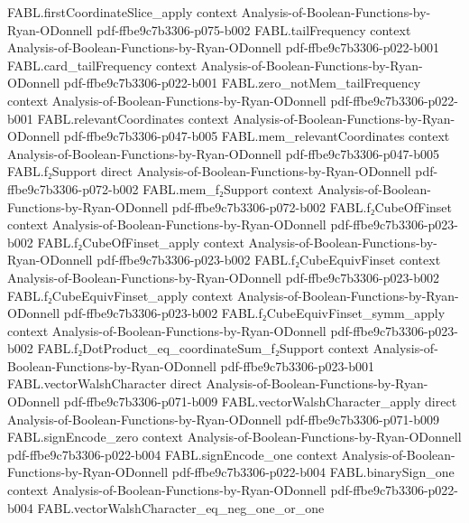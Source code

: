 \begin{theorem}
  {FABL.firstCoordinateSlice_apply}
  {context}
  {Analysis-of-Boolean-Functions-by-Ryan-ODonnell}
  {pdf-ffbe9c7b3306-p075-b002}
\proofstep
  {FABL.tailFrequency}
  {context}
  {Analysis-of-Boolean-Functions-by-Ryan-ODonnell}
  {pdf-ffbe9c7b3306-p022-b001}
\proofstep
  {FABL.card_tailFrequency}
  {context}
  {Analysis-of-Boolean-Functions-by-Ryan-ODonnell}
  {pdf-ffbe9c7b3306-p022-b001}
\proofstep
  {FABL.zero_notMem_tailFrequency}
  {context}
  {Analysis-of-Boolean-Functions-by-Ryan-ODonnell}
  {pdf-ffbe9c7b3306-p022-b001}
\proofstep
  {FABL.relevantCoordinates}
  {context}
  {Analysis-of-Boolean-Functions-by-Ryan-ODonnell}
  {pdf-ffbe9c7b3306-p047-b005}
\proofstep
  {FABL.mem_relevantCoordinates}
  {context}
  {Analysis-of-Boolean-Functions-by-Ryan-ODonnell}
  {pdf-ffbe9c7b3306-p047-b005}
\proofstep
  {FABL.f₂Support}
  {direct}
  {Analysis-of-Boolean-Functions-by-Ryan-ODonnell}
  {pdf-ffbe9c7b3306-p072-b002}
\proofstep
  {FABL.mem_f₂Support}
  {context}
  {Analysis-of-Boolean-Functions-by-Ryan-ODonnell}
  {pdf-ffbe9c7b3306-p072-b002}
\proofstep
  {FABL.f₂CubeOfFinset}
  {context}
  {Analysis-of-Boolean-Functions-by-Ryan-ODonnell}
  {pdf-ffbe9c7b3306-p023-b002}
\proofstep
  {FABL.f₂CubeOfFinset_apply}
  {context}
  {Analysis-of-Boolean-Functions-by-Ryan-ODonnell}
  {pdf-ffbe9c7b3306-p023-b002}
\proofstep
  {FABL.f₂CubeEquivFinset}
  {context}
  {Analysis-of-Boolean-Functions-by-Ryan-ODonnell}
  {pdf-ffbe9c7b3306-p023-b002}
\proofstep
  {FABL.f₂CubeEquivFinset_apply}
  {context}
  {Analysis-of-Boolean-Functions-by-Ryan-ODonnell}
  {pdf-ffbe9c7b3306-p023-b002}
\proofstep
  {FABL.f₂CubeEquivFinset_symm_apply}
  {context}
  {Analysis-of-Boolean-Functions-by-Ryan-ODonnell}
  {pdf-ffbe9c7b3306-p023-b002}
\proofstep
  {FABL.f₂DotProduct_eq_coordinateSum_f₂Support}
  {context}
  {Analysis-of-Boolean-Functions-by-Ryan-ODonnell}
  {pdf-ffbe9c7b3306-p023-b001}
\proofstep
  {FABL.vectorWalshCharacter}
  {direct}
  {Analysis-of-Boolean-Functions-by-Ryan-ODonnell}
  {pdf-ffbe9c7b3306-p071-b009}
\proofstep
  {FABL.vectorWalshCharacter_apply}
  {direct}
  {Analysis-of-Boolean-Functions-by-Ryan-ODonnell}
  {pdf-ffbe9c7b3306-p071-b009}
\proofstep
  {FABL.signEncode_zero}
  {context}
  {Analysis-of-Boolean-Functions-by-Ryan-ODonnell}
  {pdf-ffbe9c7b3306-p022-b004}
\proofstep
  {FABL.signEncode_one}
  {context}
  {Analysis-of-Boolean-Functions-by-Ryan-ODonnell}
  {pdf-ffbe9c7b3306-p022-b004}
\proofstep
  {FABL.binarySign_one}
  {context}
  {Analysis-of-Boolean-Functions-by-Ryan-ODonnell}
  {pdf-ffbe9c7b3306-p022-b004}
\proofstep
  {FABL.vectorWalshCharacter_eq_neg_one_or_one}

\end{theorem}
